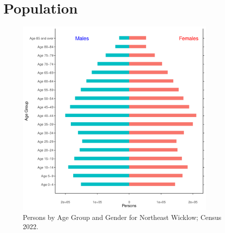 \documentclass{article}
\begin{document}
\pagebreak

\section{Population} 
\label{sect:Pop}

\begin{figure}[h]
	\centering
	\includegraphics[width = 100mm]{../figures/PyramidPlot.pdf}
	\caption{Persons by Age Group and Gender for Northeast Wicklow; Census 2022.}
	\label{fig:2ae19629-1a6a-13a3-e055-000000000001}
	\end{figure}
\end{document}
